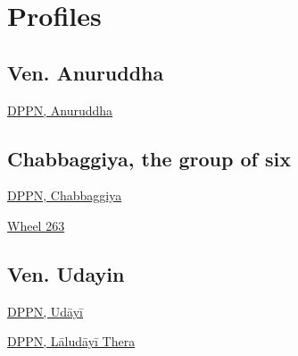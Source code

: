 \chapter{Profiles}

\section{Ven. Anuruddha}

\href{https://what-buddha-said.net/library/DPPN/ay/anuruddha.htm}{DPPN,
Anuruddha}

\section{Chabbaggiya, the group of six}

\href{https://what-buddha-said.net/library/DPPN/c/chabbaggiyaa.htm}{DPPN,
Chabbaggiya}

\href{https://what-buddha-said.net/library/ati_website/html/lib/authors/hecker/wheel263.html}{Wheel
263}

\section{Ven. Udayin}

\href{https://what-buddha-said.net/library/DPPN/u/udaayii.htm}{DPPN,
Udāyī}

\href{https://what-buddha-said.net/library/DPPN/l/laludayi_th.htm}{DPPN,
Lāludāyī Thera}

